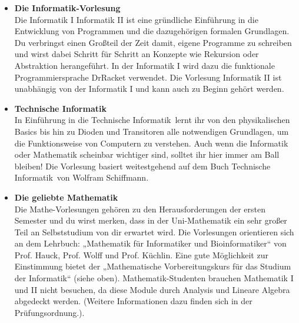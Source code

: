 \ifbachelor
{}
\begin{itemize}
	\item 
	\textbf{Die Informatik-Vorlesung} \\
	Die 
	\ifwintersemester Informatik I \fi
	\ifsommersemester Informatik II \fi 
	ist eine gründliche Einführung in die Entwicklung von Programmen und die dazugehörigen formalen Grundlagen. 
	Du verbringst einen Großteil der Zeit damit, eigene Programme zu schreiben und wirst dabei Schritt für Schritt 
	an Konzepte wie Rekursion oder Abstraktion herangeführt. 
	\ifwintersemester In der Informatik I wird dazu die funktionale Programmiersprache DrRacket verwendet. \fi
	\ifsommersemester Die Vorlesung Informatik II ist unabhängig von der Informatik I und kann auch zu Beginn gehört werden. \fi
	
	\ifinfo
	\ifwintersemester
	\item 
	\textbf{Technische Informatik} \\
	In \glqq Einführung in die Technische Informatik\grqq \ lernt ihr von den physikalischen Basics bis hin zu Dioden und Transitoren alle notwendigen Grundlagen, um die Funktionsweise von Computern zu verstehen. Auch wenn die Informatik oder Mathematik scheinbar wichtiger sind, solltet ihr hier immer am Ball bleiben! Die Vorlesung basiert weitestgehend auf dem Buch \glqq Technische Informatik\grqq \ von Wolfram Schiffmann.
	\fi
	\fi
	
	\item 
	\textbf{Die geliebte Mathematik} \\
	Die Mathe-Vorlesungen gehören zu den Herausforderungen der ersten Semester und du wirst merken, dass in der Uni-Mathematik ein sehr großer Teil an Selbststudium von dir erwartet wird. Die Vorlesungen orientieren sich an dem Lehrbuch: „Mathematik für Informatiker und Bioinformatiker“ von Prof. Hauck, Prof. Wolff und Prof. Küchlin. Eine gute Möglichkeit zur Einstimmung bietet der „Mathematische Vorbereitungskurs für das Studium der Informatik“ (siehe oben). 
	\iflehramt
	Mathematik-Studenten brauchen Mathematik I
	und II nicht besuchen, da diese Module durch Analysis und Lineare Algebra
	abgedeckt werden. (Weitere Informationen dazu finden sich in der
	Prüfungsordnung.).
	\fi
\end{itemize}
\fi


\iflehramt
\pagebreak
\fi
